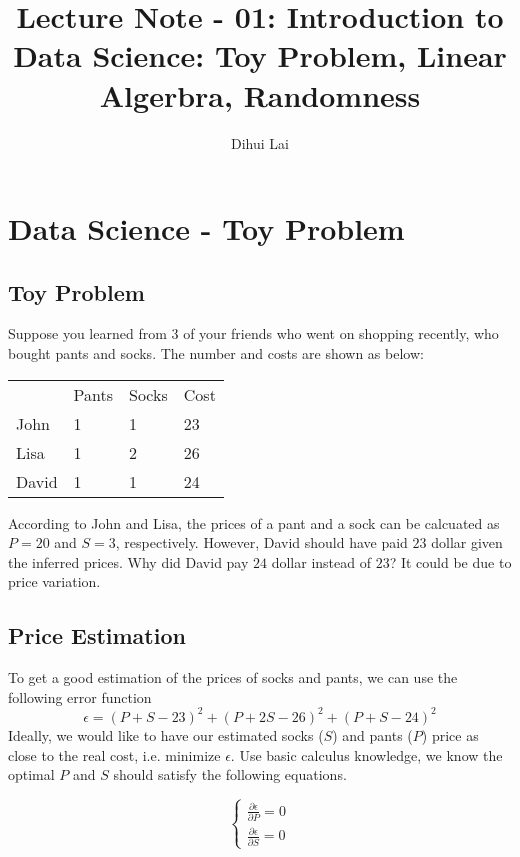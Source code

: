 \documentclass[12pt, oneside]{article}
\title{Lecture Note - 01: Introduction to Data Science: Toy Problem, Linear Algerbra, Randomness}
\author{Dihui Lai}
\begin{document}
\maketitle
\tableofcontents

\vspace{.25in}

\section{Data Science - Toy Problem}

\subsection{Toy Problem}
Suppose you learned from 3 of your friends who went on shopping recently, who bought pants and socks. The number and costs are shown as below:

\vspace{.1in}
\begin{tabular}{llll}
 &Pants  &Socks &Cost  \\
 John &1 	 &1      &23   \\
 Lisa &1      &2      &26   \\
 David &1      &1      &24 
\end{tabular}

\vspace{.1in}
According to John and Lisa, the prices of a pant and a sock can be calcuated as $P=20$ and $S=3$, respectively. However, David should have paid $23$ dollar given the inferred prices. Why did David pay $24$ dollar instead of $23$? It could be due to price variation.

\subsection{Price Estimation}
To get a good estimation of the prices of socks and pants, we can use the following error function
$$\epsilon=(P+S-23)^2+(P+2S-26)^2+(P+S-24)^2$$
Ideally, we would like to have our estimated socks ($S$) and pants ($P$) price as close to the real cost, i.e. minimize $\epsilon$.
Use basic calculus knowledge, we know the optimal $P$ and $S$ should satisfy the following equations.

\begin{equation}
\begin{cases}
\frac{\partial{\epsilon}}{\partial{P}}=0\\
\frac{\partial{\epsilon}}{\partial{S}}=0
\end{cases}
\end{equation}
\end{document}
